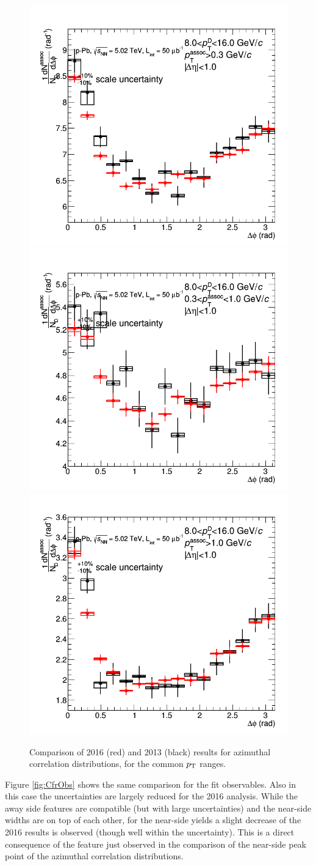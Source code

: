 \begin{figure}[!htbp]
{\includegraphics[width=0.47\linewidth]{figures/Cfr2013vs2016/Average_Cfr_2013_2016_Pt8to16_Thr03to99.png}}
{\includegraphics[width=0.47\linewidth]{figures/Cfr2013vs2016/Average_Cfr_2013_2016_Pt8to16_Thr03to1.png}}
{\includegraphics[width=0.47\linewidth]{figures/Cfr2013vs2016/Average_Cfr_2013_2016_Pt8to16_Thr1to99.png}}
\caption{Comparison of 2016 (red) and 2013 (black) results for azimuthal correlation distributions, for the common $p_{\rm T}$ ranges.}
\label{fig:CfrAverage}
\end{figure}

Figure \ref{fig:CfrObs} shows the same comparison for the fit observables. Also in this case the uncertainties are largely reduced for the 2016 analysis. While the away side features are compatible (but with large uncertainties) and the near-side widths are on top of each other, for the near-side yields a slight decrease of the 2016 results is observed (though well within the uncertainty). This is a direct consequence of the feature just observed in the comparison of the near-side peak point of the azimuthal correlation distributions.

